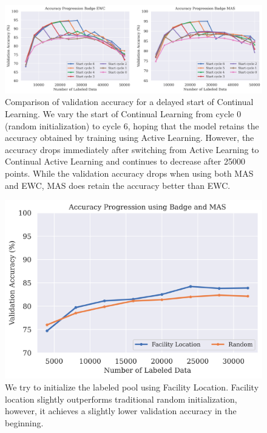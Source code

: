 \begin{figure}[ht]
    \centering
    \includegraphics[width=\linewidth]{images/results_CAL/Delayed_start_CAL.png}
    \caption[Continual Active Learning Badge 4000 batch size]{Comparison of validation accuracy for a delayed start of Continual Learning. We vary the start of Continual Learning from 
    cycle 0 (random initialization) to cycle 6, hoping that the model retains the accuracy obtained by training using Active Learning. However, the accuracy drops immediately after switching
    from Active Learning to Continual Active Learning and continues to decrease after 25000 points. While the validation accuracy drops when using both MAS and EWC, MAS does retain the accuracy
    better than EWC.}
    \label{fig:Evaluation:Results:CAL:DelayedStart}
\end{figure}


\begin{figure}[ht]
    \centering
    \includegraphics[width=\linewidth]{images/results_CAL/Factility_location_init.png}
    \caption[Initialization using Facility Location]{We try to initialize the labeled pool using Facility Location. Facility location slightly outperforms traditional random initialization, however,
    it achieves a slightly lower validation accuracy in the beginning.}
    \label{fig:Evaluation:Results:CAL:FLinit}
\end{figure}

